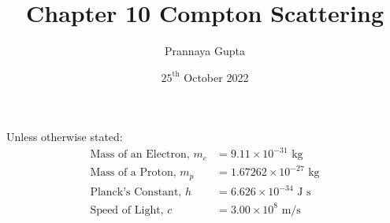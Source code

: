 \documentclass[a4paper, 12pt, addpoints]{exam}
\title{Chapter 10 \textbf{Compton Scattering}}
\author{Prannaya Gupta}
\date{$25^{\text{th}}$ October 2022}
\begin{document}
\maketitle


\begin{tcolorbox}
Unless otherwise stated:
\begin{align*}
\text{Mass of an Electron, }m_e &= 9.11 \times 10^{-31}\text{ kg} \\
\text{Mass of a Proton, }m_p &= 1.67262 \times 10^{-27}\text{ kg} \\
\text{Planck's Constant, }h &= 6.626 \times 10^{-34}\text{ J s} \\
\text{Speed of Light, }c &= 3.00 \times 10^8 \text{ m/s}
\end{align*}
\end{tcolorbox}
\newpage
\end{document}
